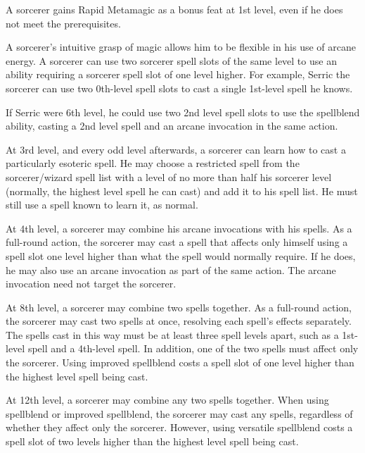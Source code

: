  A sorcerer gains Rapid Metamagic as a bonus feat at 1st level, even if he does not meet the prerequisites.

 A sorcerer's intuitive grasp of magic allows him to be flexible in his use of arcane energy. A sorcerer can use two sorcerer spell slots of the same level to use an ability requiring a sorcerer spell slot of one level higher. For example, Serric the sorcerer can use two 0th-level spell slots to cast a single 1st-level spell he knows.

If Serric were 6th level, he could use two 2nd level spell slots to use the spellblend ability, casting a 2nd level spell and an arcane invocation in the same action.

 At 3rd level, and every odd level afterwards, a sorcerer can learn how to cast a particularly esoteric spell. He may choose a restricted spell from the sorcerer/wizard spell list with a level of no more than half his sorcerer level (normally, the highest level spell he can cast) and add it to his spell list. He must still use a spell known to learn it, as normal.

 At 4th level, a sorcerer may combine his arcane invocations with his spells. As a full-round action, the sorcerer may cast a spell that affects only himself using a spell slot one level higher than what the spell would normally require. If he does, he may also use an arcane invocation as part of the same action. The arcane invocation need not target the sorcerer.

 At 8th level, a sorcerer may combine two spells together. As a full-round action, the sorcerer may cast two spells at once, resolving each spell's effects separately. The spells cast in this way must be at least three spell levels apart, such as a 1st-level spell and a 4th-level spell. In addition, one of the two spells must affect only the sorcerer. Using improved spellblend costs a spell slot of one level higher than the highest level spell being cast.

 At 12th level, a sorcerer may combine any two spells together. When using spellblend or improved spellblend, the sorcerer may cast any spells, regardless of whether they affect only the sorcerer. However, using versatile spellblend costs a spell slot of two levels higher than the highest level spell being cast.

